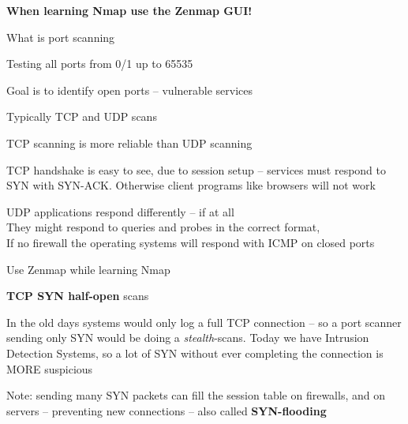 \documentclass[Screen16to9,17pt]{foils}
\begin{document}
\centerline{\bf When learning Nmap use the Zenmap GUI!}




What is port scanning
\begin{list2}
\item Testing all ports from 0/1 up to 65535
\item Goal is to identify open ports -- vulnerable services
\item Typically TCP and UDP scans
\item TCP scanning is more reliable than UDP scanning
\item TCP handshake is easy to see, due to session setup -- services must respond to SYN with SYN-ACK. Otherwise client programs like browsers will not work
\item UDP applications respond differently -- if at all\\
They might respond to queries and probes in the correct format, \\
If no firewall the operating systems will respond with ICMP on closed ports
\item Use Zenmap while learning Nmap
\end{list2}




\begin{list2}
\item {\bfseries TCP SYN half-open} scans
\item In the old days systems would only log a full TCP connection
  -- so a port scanner sending only SYN would be doing a \emph{stealth}-scans. Today we have Intrusion Detection Systems, so a lot of SYN without ever completing the connection is MORE suspicious
\item Note: sending many SYN packets can fill the session table on firewalls, and on servers -- preventing new connections -- also called {\bfseries SYN-flooding}
\end{list2}
\end{document}
